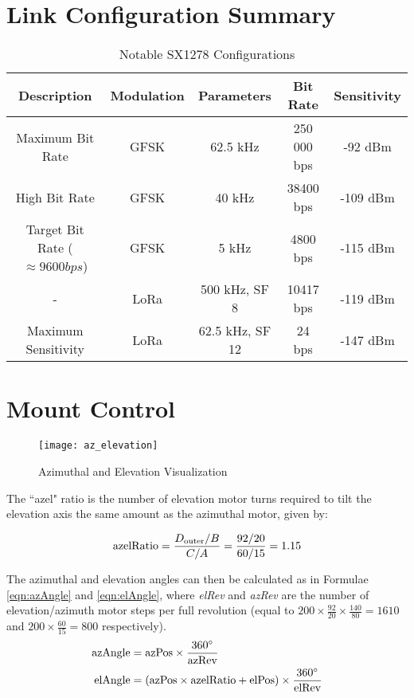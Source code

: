 \section{Link Configuration Summary}
\begin{table}[!htb]
    \centering
    \renewcommand{\arraystretch}{1.2}
    \begin{tabular}{ |c|c|c|c|c| }
    \hline
    \textbf{Description} & \textbf{Modulation} & \textbf{Parameters} & \textbf{Bit Rate} & \textbf{Sensitivity} \\
    \hline
    Maximum Bit Rate &
    GFSK &
    62.5 kHz &
    250 000 bps &
    -92 dBm \\
    \hline
    High Bit Rate &
    GFSK &
    40 kHz &
    38400 bps &
    -109 dBm \\
    \hline
    Target Bit Rate ($\approx 9600 bps$) &
    GFSK &
    5 kHz &
    4800 bps &
    -115 dBm \\
    \hline
    - &
    LoRa &
    500 kHz, SF 8 &
    10417 bps &
    -119 dBm \\
    \hline
    Maximum Sensitivity &
    LoRa &
    62.5 kHz, SF 12 &
    24 bps &
    -147 dBm \\
    \hline
    \end{tabular}
    \caption{Notable SX1278 Configurations \cite{datasheet-SX1278}}
    \label{tab:sensitivity_values}
  \end{table}


\clearpage
\section{Mount Control}\label{sec:appendix_mount_control}
\begin{figure}[!htb]
    \centering
    \texttt{[image: az\_elevation]}
    \caption{Azimuthal and Elevation Visualization \cite{site-azElevationVisual}}
    \label{fig:az_elevation}
\end{figure}
The ``azel" ratio is the number of elevation motor turns required to tilt the elevation axis the same amount as the azimuthal motor, given by:

\begin{equation}\label{eqn:azelRatio}
\textnormal{azelRatio} = \frac{D_{\textnormal{outer}} / B}{C / A} = \frac{92 / 20}{60 / 15} = 1.15
\end{equation}

\noindent The azimuthal and elevation angles can then be calculated as in Formulae \ref{eqn:azAngle} and \ref{eqn:elAngle}, where \textit{elRev} and \textit{azRev} are the number of elevation/azimuth motor steps per full revolution (equal to $200 \times \frac{92}{20} \times \frac{140}{80} = 1610$ and $200 \times \frac{60}{15} = 800$ respectively).
\begin{align}
    \textnormal{azAngle} &= \textnormal{azPos} \times \frac{360 ^{\circ}}{\textnormal{azRev}} \label{eqn:azAngle} \\
    \textnormal{elAngle} &= (\textnormal{azPos} \times \textnormal{azelRatio} + \textnormal{elPos}) \times \frac{360 ^{\circ}}{\textnormal{elRev}} \label{eqn:elAngle}
\end{align}

